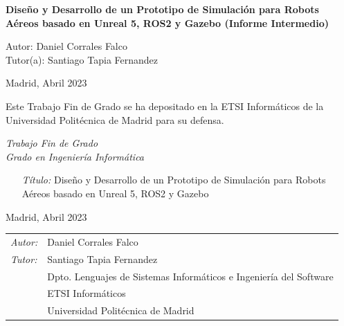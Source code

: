 \begin{titlepage}
\vspace*{0.5cm}
\begin{center}
\huge\bfseries { Diseño y Desarrollo de un Prototipo de Simulación para Robots Aéreos basado en Unreal 5, ROS2 y Gazebo (Informe Intermedio)} 
\end{center}

\vspace*{5cm}

\noindent
\large{Autor: Daniel Corrales Falco }\\
\large{Tutor(a): Santiago Tapia Fernandez }


\vspace*{3cm}
\begin{center}
Madrid, Abril 2023
\end{center}

\newpage
\thispagestyle{empty}
\noindent
Este Trabajo Fin de Grado se ha depositado en la ETSI Informáticos de la Universidad Politécnica de Madrid para su defensa.

\vspace*{4cm}
\noindent
\textit{Trabajo Fin de Grado}\\
\textit{Grado en Ingeniería Informática} 

\begin{enumerate}
\item[\textit{Título:}]  Diseño y Desarrollo de un Prototipo de Simulación para Robots Aéreos basado en Unreal 5, ROS2 y Gazebo
\end{enumerate}
Madrid, Abril 2023


\vspace*{3cm}

\noindent
\begin{tabular}{ll}
\textit{Autor:} & Daniel Corrales Falco \\ 
\textit{Tutor:} &  Santiago Tapia Fernandez  \\ 
                & Dpto. Lenguajes de Sistemas Informáticos e Ingeniería del Software \\
                & ETSI Informáticos\\
                & Universidad Politécnica de Madrid
\end{tabular} 

\end{titlepage}
